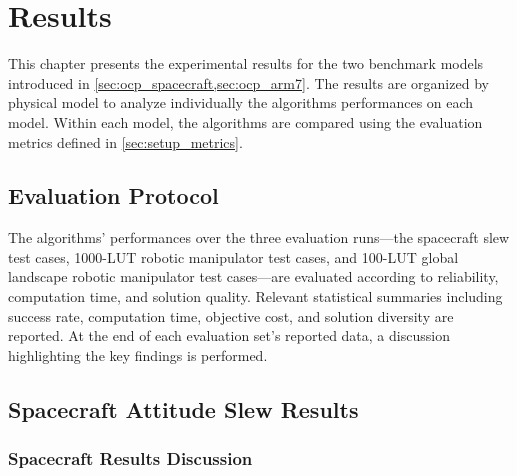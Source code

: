 \chapter{Results}
\label{ch:results}

This chapter presents the experimental results for the two benchmark models introduced in \cref{sec:ocp_spacecraft,sec:ocp_arm7}. 
The results are organized by physical model to analyze individually the algorithms performances on each model. 
Within each model, the algorithms are compared using the evaluation metrics defined in \cref{sec:setup_metrics}.

\section{Evaluation Protocol}
\label{sec:results_protocol}


The algorithms' performances over the three evaluation runs---the spacecraft slew test cases, 1000-\ac{LUT} robotic manipulator 
test cases, and 100-\ac{LUT} global landscape robotic manipulator test cases---are evaluated
according to reliability, computation time, and solution quality. Relevant statistical summaries including 
success rate, computation time, objective cost, and solution diversity are reported.
At the end of each evaluation set's reported data, a discussion highlighting the key findings
is performed.

\section{Spacecraft Attitude Slew Results}
\label{sec:results_spacecraft}

\subsection{Spacecraft Results Discussion}
\label{sec:results_spacecraft_discussion}


